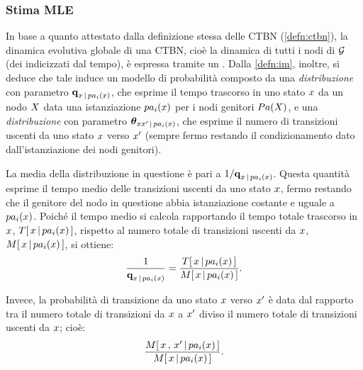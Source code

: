 \subsubsection{Stima \acl{MLE}}
\label{sec:ctbn-mle-params}
In base a quanto attestato dalla definizione stessa delle \acs{CTBN} (\ref{defn:ctbn}), la dinamica evolutiva globale di una \acs{CTBN}, cioè la dinamica di tutti i nodi di $\mathcal{G}$ (dei \mprocess{} \cond{} indicizzati dal tempo), è espressa tramite un \mprocess*{} \omog*{}. Dalla \autoref{defn:im}, inoltre, si deduce che tale \mprocess*{} induce un modello di probabilità composto da una \emph{distribuzione } con parametro $\boldsymbol{\textbf{\text{q}}}_{x\,\arrowvert\,pa_i(\mathnormal{x})}$, che esprime il tempo trascorso in uno stato $\mathnormal{x}$ da un nodo $\mathnormal{X}$ data una istanziazione $pa_i(\mathnormal{x})$ per i nodi genitori $Pa(\mathnormal{X})$, e una \emph{distribuzione } con parametro $\boldsymbol{\textbf{\text{$\theta$}}}_{\mathnormal{x}\mathnormal{x}^\prime\,\arrowvert\,pa_i(\mathnormal{x})}$, che esprime il numero di transizioni uscenti da uno stato $\mathnormal{x}$ verso $\mathnormal{x}^\prime$ (sempre fermo restando il condizionamento dato dall'istanziazione dei nodi genitori).

La media della distribuzione  in questione è pari a $1/\boldsymbol{\textbf{\text{q}}}_{\mathnormal{x}\,\arrowvert\,pa_i(\mathnormal{x})}$. Questa quantità esprime il tempo medio delle transizioni uscenti da uno stato $\mathnormal{x}$, fermo restando che il genitore del nodo in questione abbia istanziazione costante e uguale a $pa_i(\mathnormal{x})$. Poiché il tempo medio si calcola rapportando il tempo totale trascorso in $\mathnormal{x}$, $T[\,\mathnormal{\mathnormal{x}\,\arrowvert\,pa_i(\mathnormal{x})}\,]$, rispetto al numero totale di transizioni uscenti da $\mathnormal{x}$, $\mstat{x\,\arrowvert\,pa_i(\setel{x})}$, si ottiene:
\[
\frac{1}{\param{q}_{\setel{x}\,\arrowvert\,pa_i(\setel{x})}}=\frac{\tstat{x\,\arrowvert\,pa_i(\setel{x})}}{\mstat{x\,\arrowvert\,pa_i(\setel{x})}}\text{.}
\]

Invece, la probabilità di transizione da uno stato $\mathnormal{x}$ verso $\mathnormal{x}^\prime$ è data dal rapporto tra il numero totale di transizioni da $\mathnormal{x}$ a $\mathnormal{x}^\prime$ diviso il numero totale di transizioni uscenti da $\mathnormal{x}$; cioè:
\[
\frac{\mstat[x]{\setel{x}^\prime\,\arrowvert\,pa_i(\setel{x})}}{\mstat{\setel{x}\,\arrowvert\,pa_i(\setel{x})}}\text{.}
\]

